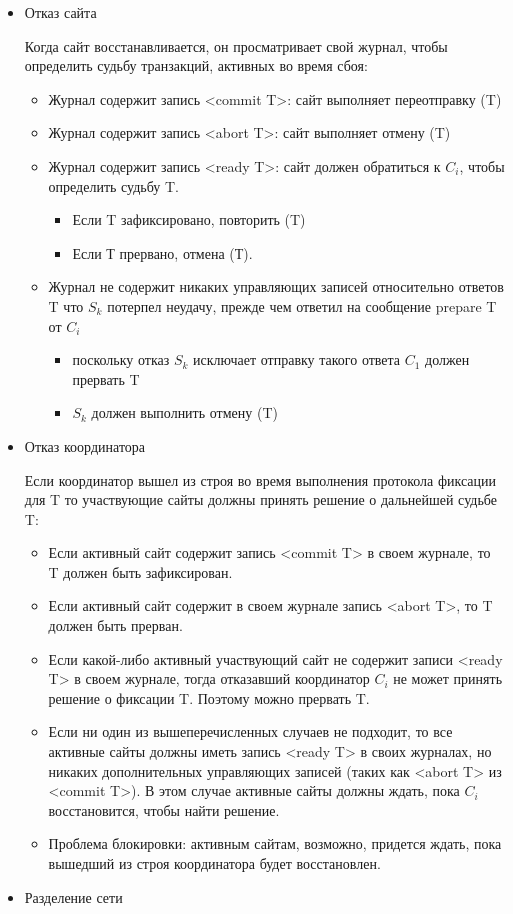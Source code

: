 \begin{itemize}
\item Отказ сайта

Когда сайт восстанавливается, он просматривает свой журнал, чтобы определить судьбу транзакций, активных во время сбоя\autocite{Fixations}:
\begin{itemize}
\item Журнал содержит запись <commit T>: сайт выполняет переотправку (T)
\item Журнал содержит запись <abort T>: сайт выполняет отмену (T)
\item Журнал содержит запись <ready T>: сайт должен обратиться к $C_i$, чтобы определить судьбу T.
\begin{itemize}
\item Если T зафиксировано, повторить (T)
\item Если Т прервано, отмена (Т).
\end{itemize}
\item Журнал не содержит никаких управляющих записей относительно ответов T что $S_k$ потерпел неудачу, прежде чем ответил на сообщение prepare T от $C_i$
\begin{itemize}
\item поскольку отказ $S_k$ исключает отправку такого ответа $C_1$ должен прервать T
\item $S_k$ должен выполнить отмену (T)
\end{itemize}
\end{itemize}  

\item Отказ координатора

Если координатор вышел из строя во время выполнения протокола фиксации для T то участвующие сайты должны принять решение о дальнейшей судьбе T\autocite{Fixations}:
\begin{itemize}
\item Если активный сайт содержит запись <commit T> в своем журнале, то T должен быть зафиксирован.
\item Если активный сайт содержит в своем журнале запись <abort T>, то T должен быть прерван.
\item Если какой-либо активный участвующий сайт не содержит записи <ready T> в своем журнале, тогда отказавший координатор $C_i$ не может принять решение о фиксации T. Поэтому можно прервать T.
\item Если ни один из вышеперечисленных случаев не подходит, то все активные сайты должны иметь запись <ready T> в своих журналах, но никаких дополнительных управляющих записей (таких как <abort T> из <commit T>). В этом случае активные сайты должны ждать, пока $C_i$ восстановится, чтобы найти решение.
\item Проблема блокировки: активным сайтам, возможно, придется ждать, пока вышедший из строя координатора будет восстановлен.
\end{itemize}
\item Разделение сети


\end{itemize}
